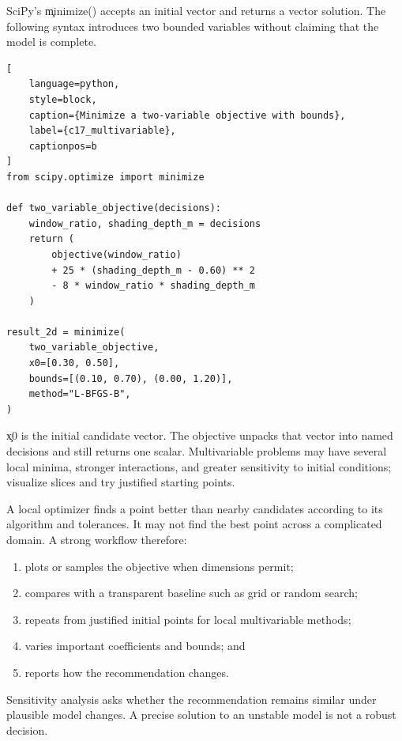 
SciPy's \c{minimize()} accepts an initial vector and returns a vector solution.
The following syntax introduces two bounded variables without claiming that the
model is complete.

\begin{lstlisting}[
    language=python,
    style=block,
    caption={Minimize a two-variable objective with bounds},
    label={c17_multivariable},
    captionpos=b
]
from scipy.optimize import minimize

def two_variable_objective(decisions):
    window_ratio, shading_depth_m = decisions
    return (
        objective(window_ratio)
        + 25 * (shading_depth_m - 0.60) ** 2
        - 8 * window_ratio * shading_depth_m
    )

result_2d = minimize(
    two_variable_objective,
    x0=[0.30, 0.50],
    bounds=[(0.10, 0.70), (0.00, 1.20)],
    method="L-BFGS-B",
)
\end{lstlisting}

\c{x0} is the initial candidate vector. The objective unpacks that vector into
named decisions and still returns one scalar. Multivariable problems may have
several local minima, stronger interactions, and greater sensitivity to initial
conditions; visualize slices and try justified starting points.


A local optimizer finds a point better than nearby candidates according to its
algorithm and tolerances. It may not find the best point across a complicated
domain. A strong workflow therefore:

\begin{enumerate}
    \item plots or samples the objective when dimensions permit;
    \item compares with a transparent baseline such as grid or random search;
    \item repeats from justified initial points for local multivariable methods;
    \item varies important coefficients and bounds; and
    \item reports how the recommendation changes.
\end{enumerate}

Sensitivity analysis asks whether the recommendation remains similar under
plausible model changes. A precise solution to an unstable model is not a robust
decision.

